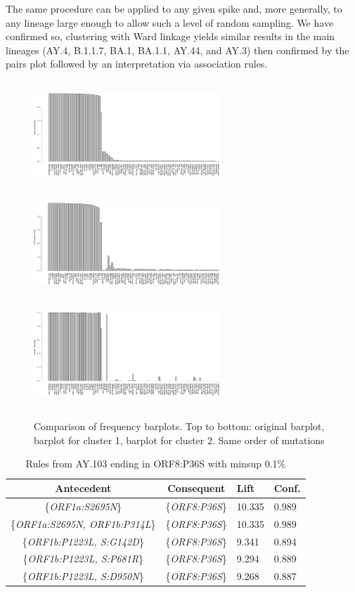 \documentclass[twoside,twocolumn]{article}
\begin{document}
	The same procedure can be applied to any given spike and, more generally, to any lineage large enough to allow such a level of random sampling. We have confirmed so, clustering with Ward linkage yields similar results in the main lineages (AY.4, B.1.1.7, BA.1, BA.1.1, AY.44, and AY.3) then confirmed by the pairs plot followed by an interpretation via association rules. 
	\begin{figure}[h]
		\caption{Comparison of frequency barplots. Top to bottom: original barplot, barplot for cluster 1, barplot for cluster 2. Same order of mutations}
		\label{comparison}
		\centering
		\includegraphics[width=70mm, height=40mm]{c0.png}
		\includegraphics[width=70mm, height=40mm]{c1.png}
		\includegraphics[width=70mm, height=40mm]{c2.png}
	\end{figure}
	\begin{table}[htb]
		\caption{Rules from AY.103 ending in ORF8:P36S with minsup 0.1\%}
		\label{table:1}
		\renewcommand{\tabcolsep}{2pc} %
		\renewcommand{\arraystretch}{1.5} %
		\begin{tabularx}{\linewidth}{| c | c | X | X |}
			\hline
			Antecedent & Consequent & Lift & Conf. \\
			\hline
			\{\textit{ORF1a:S2695N}\} & \{\textit{ORF8:P36S}\}  & 10.335 & 0.989\\
			\{\textit{ORF1a:S2695N, ORF1b:P314L}\} & \{\textit{ORF8:P36S}\} & 10.335 & 0.989\\
			\{\textit{ORF1b:P1223L, S:G142D}\} & \{\textit{ORF8:P36S}\} & 9.341 & 0.894\\
			\{\textit{ORF1b:P1223L, S:P681R}\} & \{\textit{ORF8:P36S}\} & 9.294 & 0.889\\
			\{\textit{ORF1b:P1223L, S:D950N}\} & \{\textit{ORF8:P36S}\} & 9.268 & 0.887\\
			\hline
		\end{tabularx}\\[4pt]
	\end{table}
\end{document}
